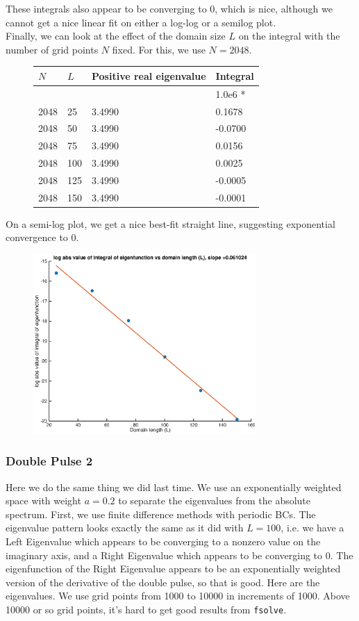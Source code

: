 \documentclass[12pt]{article}
\begin{document}
These integrals also appear to be converging to 0, which is nice, although we cannot get a nice linear fit on either a log-log or a semilog plot. \\

Finally, we can look at the effect of the domain size $L$ on the integral with the number of grid points $N$ fixed. For this, we use $N = 2048$.

\begin{figure}[H]
\begin{tabular}{llll}
$N$    & $L$    & Positive real eigenvalue  &  Integral     \\ \hline
       &        &           &  1.0e6 *     \\
  2048 &  25    &   3.4990  &      0.1678 \\ 
  2048 &  50    &   3.4990  &     -0.0700 \\ 
  2048 &  75    &   3.4990  &      0.0156 \\
  2048 &  100   &   3.4990  &      0.0025 \\
  2048 &  125   &   3.4990  &     -0.0005 \\ 
  2048 &  150   &   3.4990  &     -0.0001 \\
\end{tabular}
\end{figure}

On a semi-log plot, we get a nice best-fit straight line, suggesting exponential convergence to 0.
\begin{figure}[H]
\includegraphics[width=8.5cm]{1double1fouriereigenfnintegralL2048}
\end{figure}


\subsubsection*{Double Pulse 2}
Here we do the same thing we did last time. We use an exponentially weighted space with weight $a = 0.2$ to separate the eigenvalues from the absolute spectrum. First, we use finite difference methods with periodic BCs. The eigenvalue pattern looks exactly the same as it did with $L = 100$, i.e. we have a Left Eigenvalue which appears to be converging to a nonzero value on the imaginary axis, and a Right Eigenvalue which appears to be converging to 0. The eigenfunction of the Right Eigenvalue appears to be an exponentially weighted version of the derivative of the double pulse, so that is good. Here are the eigenvalues. We use grid points from 1000 to 10000 in increments of 1000. Above 10000 or so grid points, it's hard to get good results from \texttt{fsolve}.
\end{document}
